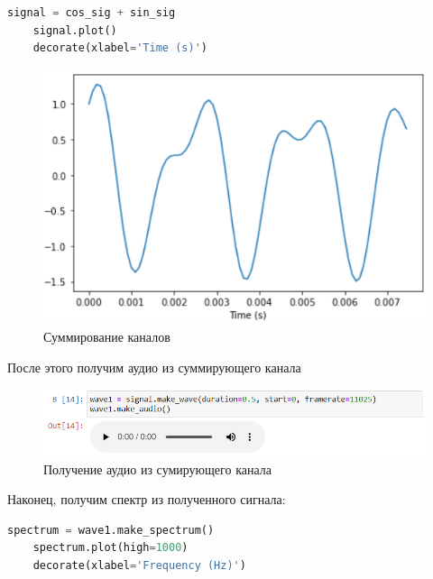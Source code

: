 \documentclass[a4paper]{article}
\begin{document}
\begin{lstlisting}[language=Python, caption= Суммирование каналов]
    signal = cos_sig + sin_sig
    signal.plot()
    decorate(xlabel='Time (s)')
\end{lstlisting}
            
            \begin{figure}[H]
                \centering
                \includegraphics[width=\textwidth]{spectr_sum.png}
                \caption{Суммирование каналов}
                \label{fig:spectr_sum}
            \end{figure}
            
            После этого получим аудио из суммирующего канала
            
             \begin{figure}[H]
                \centering
                \includegraphics[width=\textwidth]{spectr_sum_audio.png}
                \caption{Получение аудио из сумирующего канала}
                \label{fig:spectr_sum_audio}
            \end{figure}
            
            Наконец, получим спектр из полученного сигнала:

\begin{lstlisting}[language=Python, caption= Получение спектра]
    spectrum = wave1.make_spectrum()
    spectrum.plot(high=1000)
    decorate(xlabel='Frequency (Hz)')
\end{lstlisting}
            
\end{document}
